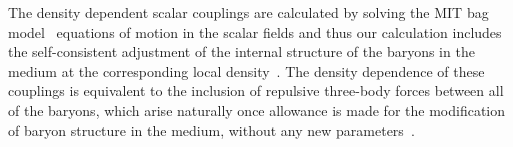 The density dependent scalar couplings are calculated by solving the MIT bag model~\cite{Chodos:1974pn_Baryonstructurebag} equations of motion in the scalar fields and thus our calculation includes the self-consistent adjustment of the internal structure of the baryons in the medium at the corresponding local density~\cite{Guichon:1987jp_Possiblequarkmechanism,Guichon:1995ue_Rolenucleonstructure,Guichon:2018uew_QuarkMesonCouplingQMC}. The density dependence of these couplings is equivalent to the inclusion of repulsive three-body forces between all of the baryons, which arise naturally once allowance is made for the modification of baryon structure in the medium, without any new 
parameters~\cite{Guichon:2004xg_Quarkstructurenuclear,Thomas:2021kio_jul_Rolequarksnuclear}.